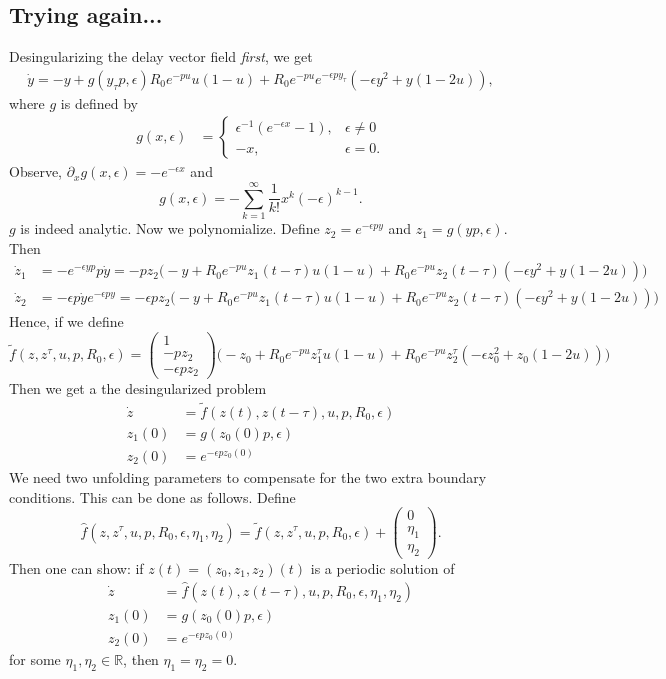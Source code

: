 \documentclass[10pt]{article}
\newcommand{\R}{\mathbb{R}}
\begin{document}
\subsection{Trying again...}
Desingularizing the delay vector field \emph{first}, we get
\begin{align*}
\dot y= -y + g(y_\tau p,\epsilon)R_0e^{-pu}u(1-u) + R_0e^{-pu}e^{-\epsilon py_\tau}(-\epsilon y^2 + y(1-2u)),
\end{align*}
where $g$ is defined by
\begin{align*}
g(x,\epsilon)&=\left\{\begin{array}{ll}\epsilon^{-1}(e^{-\epsilon x}-1),&\epsilon\neq 0 \\ -x,&\epsilon=0.\end{array}\right.
\end{align*}
Observe, $\partial_x g(x,\epsilon)=-e^{-\epsilon x}$ and $$g(x,\epsilon)=-\sum_{k=1}^\infty \frac{1}{k!}x^k(-\epsilon)^{k-1}.$$
$g$ is indeed analytic. Now we polynomialize. Define $z_2=e^{-\epsilon py}$ and $z_1=g(yp,\epsilon)$. Then
\begin{align*}
\dot z_1&=-e^{-\epsilon yp}p\dot y = -pz_2\big(-y + R_0e^{-pu}z_1(t-\tau)u(1-u) + R_0e^{-pu}z_2(t-\tau)(-\epsilon y^2 + y(1-2u)) \big)\\
\dot z_2&=-\epsilon p\dot y e^{-\epsilon py} = -\epsilon p z_2\big(-y + R_0e^{-pu}z_1(t-\tau)u(1-u) + R_0e^{-pu}z_2(t-\tau)(-\epsilon y^2 + y(1-2u)) \big)
\end{align*}
Hence, if we define $$\tilde f(z,z^\tau,u,p,R_0,\epsilon)=\left(\begin{array}{c}1\\-pz_2\\-\epsilon pz_2\end{array}\right)\big(-z_0 + R_0e^{-pu}z_1^\tau u(1-u) + R_0e^{-pu}z_2^\tau(-\epsilon z_0^2 + z_0(1-2u)) \big)$$
Then we get a the desingularized problem
\begin{align*}
\dot z&=\tilde f(z(t),z(t-\tau),u,p,R_0,\epsilon)\\
z_1(0)&=g(z_0(0)p,\epsilon)\\
z_2(0)&=e^{-\epsilon p z_0(0)}
\end{align*}
We need two unfolding parameters to compensate for the two extra boundary conditions. This can be done as follows. Define 
$$\hat f(z,z^\tau,u,p,R_0,\epsilon,\eta_1,\eta_2)= \tilde f(z,z^\tau,u,p,R_0,\epsilon) + \left(\begin{array}{c}0\\\eta_1\\\eta_2\end{array}\right).$$
Then one can show: if $z(t)=(z_0,z_1,z_2)(t)$ is a periodic solution of 
\begin{align*}
\dot z&=\hat f(z(t),z(t-\tau),u,p,R_0,\epsilon,\eta_1,\eta_2)\\
z_1(0)&=g(z_0(0)p,\epsilon)\\
z_2(0)&=e^{-\epsilon pz_0(0)}
\end{align*}
for some $\eta_1,\eta_2\in\R$, then $\eta_1=\eta_2=0$.
\end{document}
